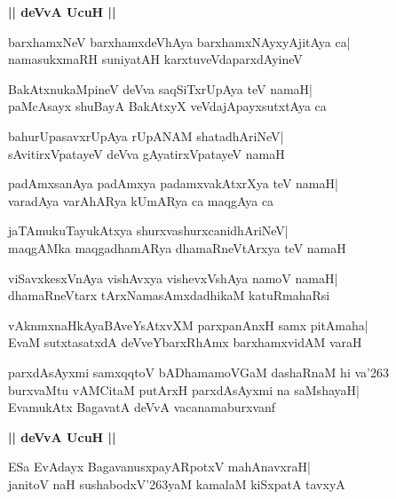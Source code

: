 \documentclass[twoside,12pt,openright]{book}
\def\S{\char'263}
\newcounter{shloka}[chapter]
\def\uvaca#1{\centerline{{\large\textbf{#1}}}}
\begin{document}
\uvaca{|| deVvA UcuH ||}
\begin{shloka}%
barxhamxNeV barxhamxdeVhAya barxhamxNAyxyAjitAya ca|\\
namasukxmaRH suniyatAH karxtuveVdaparxdAyineV
\end{shloka}

\begin{shloka}%
BakAtxnukaMpineV deVva saqSiTxrUpAya teV namaH|\\
paMcAsayx shuBayA BakAtxyX veVdajApayxsutxtAya ca 
\end{shloka}

\begin{shloka}%
bahurUpasavxrUpAya rUpANAM shatadhAriNeV|\\
sAvitirxVpatayeV deVva gAyatirxVpatayeV namaH
\end{shloka}

\begin{shloka}%
padAmxsanAya padAmxya padamxvakAtxrXya teV namaH|\\
varadAya varAhARya kUmARya ca maqgAya ca
\end{shloka}

\begin{shloka}%
jaTAmukuTayukAtxya shurxvashurxcanidhAriNeV|\\
maqgAMka maqgadhamARya dhamaRneVtArxya teV namaH
\end{shloka}

\begin{shloka}%
viSavxkesxVnAya vishAvxya vishevxVshAya namoV namaH|\\
dhamaRneVtarx tArxNamasAmxdadhikaM katuRmahaRsi
\end{shloka}

\begin{shloka}%
vAknmxnaHkAyaBAveYsAtxvXM parxpanAnxH samx pitAmaha|\\
EvaM sutxtasatxdA deVveYbarxRhAmx barxhamxvidAM varaH
\end{shloka}

\begin{shloka}%
parxdAsAyxmi samxqqtoV bADhamamoVGaM dashaRnaM hi va\S\\
burxvaMtu vAMCitaM putArxH parxdAsAyxmi na saMshayaH|\\
EvamukAtx BagavatA deVvA vacanamaburxvanf
\end{shloka}

\uvaca{|| deVvA UcuH ||}
\begin{shloka}%
ESa EvAdayx BagavanusxpayARpotxV mahAnavxraH|\\
janitoV naH sushabodxV\S yaM kamalaM kiSxpatA tavxyA
\end{shloka}
\end{document}
